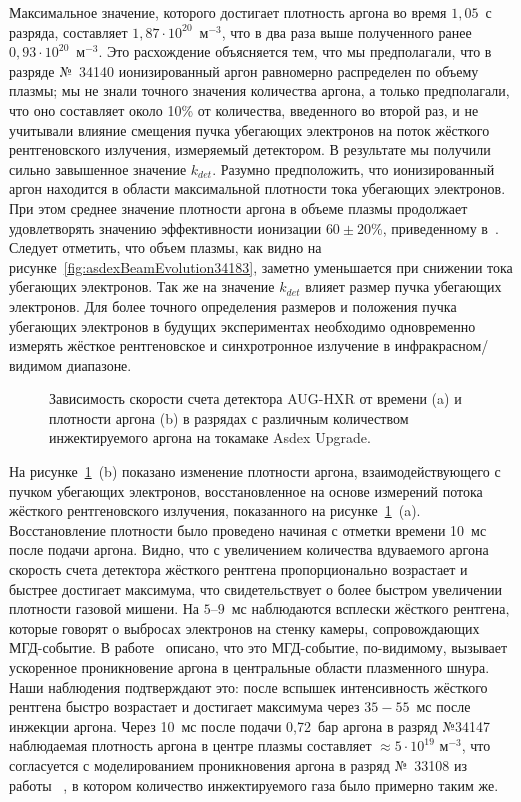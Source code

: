 Максимальное значение, которого достигает плотность аргона во время $1,05$~с разряда, составляет $1,87 \cdot 10^{20}$~м${}^{-3}$, что в два раза выше полученного ранее $0,93 \cdot 10^{20}$~м${}^{-3}$. Это расхождение объясняется тем, что мы предполагали, что в разряде №~34140 ионизированный аргон равномерно распределен по объему плазмы; мы не знали точного значения количества аргона, а только предполагали, что оно составляет около 10\% от количества, введенного во второй раз, и не учитывали влияние смещения пучка убегающих электронов на поток жёсткого рентгеновского излучения, измеряемый детектором. В результате мы получили сильно завышенное значение $k_{det}$. Разумно предположить, что ионизированный аргон находится в области максимальной плотности тока убегающих электронов. При этом среднее значение плотности аргона в объеме плазмы продолжает удовлетворять значению эффективности ионизации $60 \pm 20$\%, приведенному в~\cite{Pautasso2020}. Следует отметить, что объем плазмы, как видно на рисунке~\ref{fig:asdexBeamEvolution34183}, заметно уменьшается при снижении тока убегающих электронов. Так же на значение $k_{det}$ влияет размер пучка убегающих электронов. Для более точного определения размеров и положения пучка убегающих электронов в будущих экспериментах необходимо одновременно измерять жёсткое рентгеновское и синхротронное излучение в инфракрасном/видимом диапазоне.~\cite{Shevelev2021}

\begin{figure}[ht!]
  \caption{ Зависимость скорости счета детектора AUG-HXR от времени (a) и плотности аргона (b) в разрядах с различным количеством инжектируемого аргона на токамаке Asdex Upgrade.~\cite{Shevelev2021} }
  \label{fig:asdexArgonDensity34183}
\end{figure}

На рисунке~\ref{fig:asdexArgonDensity34183}~(b) показано изменение плотности аргона, взаимодействующего с пучком убегающих электронов, восстановленное на основе измерений потока жёсткого рентгеновского излучения, показанного на рисунке~\ref{fig:asdexArgonDensity34183}~(a). Восстановление плотности было проведено начиная с отметки времени 10~мс после подачи аргона. Видно, что с увеличением количества вдуваемого аргона скорость счета детектора жёсткого рентгена пропорционально возрастает и быстрее достигает максимума, что свидетельствует о более быстром увеличении плотности газовой мишени. На $5$--$9$~мс наблюдаются всплески жёсткого рентгена, которые говорят о выбросах электронов на стенку камеры, сопровождающих МГД-событие. В работе~\cite{Linder2020} описано, что это МГД-событие, по-видимому, вызывает ускоренное проникновение аргона в центральные области плазменного шнура. Наши наблюдения подтверждают это: после вспышек интенсивность жёсткого рентгена быстро возрастает и достигает максимума через $35-55$~мс после инжекции аргона. Через 10~мс после подачи 0,72~бар аргона в разряд №34147 наблюдаемая плотность аргона в центре плазмы составляет $\approx 5 \cdot 10^{19}$ м${}^{-3}$, что согласуется с моделированием проникновения аргона в разряд №~33108 из работы  ~\cite{Linder2020}, в котором количество инжектируемого газа было примерно таким же.~\cite{Shevelev2021}


